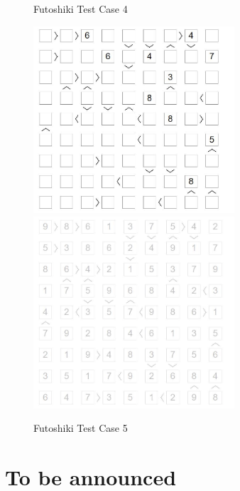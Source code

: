 ﻿\documentclass[a4paper, 11pt]{article}
\begin{document}
\begin{enumerate}
\begin{figure}[htbp]
    \caption{Futoshiki Test Case 4}
    \label{fig:case44}
  \end{figure}
        \begin{figure}[htbp]
    \centering
    \includegraphics[width=7.5cm]{Pic/f5}
    \qquad
    \includegraphics[width=7.5cm]{Pic/f5s}
    \caption{Futoshiki Test Case 5}
    \label{fig:case55}
  \end{figure}

\end{enumerate}

\section{To be announced}



%
%
\end{document}
